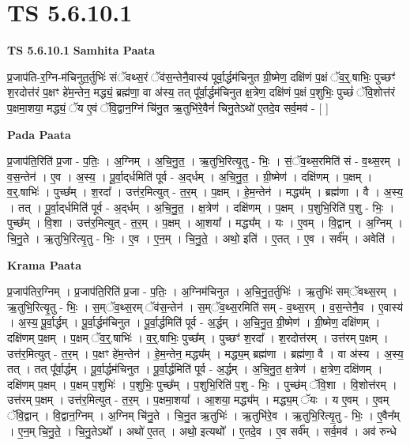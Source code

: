 \documentclass[17pt]{extarticle}
\begin{document}
\section{ TS 5.6.10.1 }

\textbf{TS 5.6.10.1 } \newline
\textbf{Samhita Paata} \newline

प्र॒जाप॑ति-र॒ग्नि-म॑चिनुत॒र्तुभिः॑ संॅवथ्स॒रं ॅव॑स॒न्तेनै॒वास्य॑ पूर्वा॒र्द्धम॑चिनुत ग्री॒ष्मेण॒ दक्षि॑णं प॒क्षं ॅव॒र्॒.षाभिः॒ पुच्छꣳ॑ श॒रदोत्त॑रं प॒क्षꣳ हे॑म॒न्तेन॒ मद्ध्यं॒ ब्रह्म॑णा॒ वा अ॑स्य॒ तत् पू᳚र्वा॒र्द्धम॑चिनुत क्ष॒त्रेण॒ दक्षि॑णं प॒क्षं प॒शुभिः॒ पुच्छं॑ ॅवि॒शोत्त॑रं प॒क्षमा॒शया॒ मद्ध्यं॒ ॅय ए॒वं ॅवि॒द्वान॒ग्निं चि॑नु॒त ऋ॒तुभि॑रे॒वैनं॑ चिनु॒तेऽथो॑ ए॒तदे॒व सर्व॒मव॑ - [  ] \newline

\textbf{Pada Paata} \newline

प्र॒जाप॑ति॒रिति॑ प्र॒जा - प॒तिः॒ । अ॒ग्निम् । अ॒चि॒नु॒त॒ । ऋ॒तुभि॒रित्यृ॒तु - भिः॒ । सं॒ॅव॒थ्स॒रमिति॑ सं - व॒थ्स॒रम् । व॒स॒न्तेन॑ । ए॒व । अ॒स्य॒ । पू॒र्वा॒द्‌र्धमिति॑ पूर्व - अ॒द्‌र्धम् । अ॒चि॒नु॒त॒ । ग्री॒ष्मेण॑ । दक्षि॑णम् । प॒क्षम् । व॒र्॒.षाभिः॑ । पुच्छ᳚म् । श॒रदा᳚ । उत्त॑र॒मित्युत् - त॒र॒म् । प॒क्षम् । हे॒म॒न्तेन॑ । मद्ध्य᳚म् । ब्रह्म॑णा । वै । अ॒स्य॒ । तत् । पू॒र्वा॒द्‌र्धमिति॑ पूर्व - अ॒द्‌र्धम् । अ॒चि॒नु॒त॒ । क्ष॒त्रेण॑ । दक्षि॑णम् । प॒क्षम् । प॒शुभि॒रिति॑ प॒शु - भिः॒ । पुच्छ᳚म् । वि॒शा । उत्त॑र॒मित्युत् - त॒र॒म् । प॒क्षम् । आ॒शया᳚ । मद्ध्य᳚म् । यः । ए॒वम् । वि॒द्वान् । अ॒ग्निम् । चि॒नु॒ते । ऋ॒तुभि॒रित्यृ॒तु - भिः॒ । ए॒व । ए॒न॒म् । चि॒नु॒ते॒ । अथो॒ इति॑ । ए॒तत् । ए॒व । सर्व᳚म् । अवेति॑ ।  \newline


\textbf{Krama Paata} \newline

प्र॒जाप॑तिर॒ग्निम् । प्र॒जाप॑ति॒रिति॑ प्र॒जा - प॒तिः॒ । अ॒ग्निम॑चिनुत । अ॒चि॒नु॒त॒र्तुभिः॑ । ऋ॒तुभिः॑ सम्ॅवथ्स॒रम् । ऋ॒तुभि॒रित्यृ॒तु - भिः॒ । स॒म्ॅव॒थ्स॒रम् ॅव॑स॒न्तेन॑ । स॒म्ॅव॒थ्स॒रमिति॑ सम् - व॒थ्स॒रम् । व॒स॒न्तेनै॒व । ए॒वास्य॑ । अ॒स्य॒ पू॒र्वा॒र्द्धम् । पू॒र्वा॒र्द्धम॑चिनुत । पू॒र्वा॒र्द्धमिति॑ पूर्व - अ॒र्द्धम् । अ॒चि॒नु॒त॒ ग्री॒ष्मेण॑ । ग्री॒ष्मेण॒ दक्षि॑णम् । दक्षि॑णम् प॒क्षम् । प॒क्षम् ॅव॒र्॒.षाभिः॑ । व॒र्॒.षाभिः॒ पुच्छ᳚म् । पुच्छꣳ॑ श॒रदा᳚ । श॒रदोत्त॑रम् । उत्त॑रम् प॒क्षम् । उत्त॑र॒मित्युत् - त॒र॒म् । प॒क्षꣳ हे॑म॒न्तेन॑ । हे॒म॒न्तेन॒ मद्ध्य᳚म् । मद्ध्य॒म् ब्रह्म॑णा । ब्रह्म॑णा॒ वै । वा अ॑स्य । अ॒स्य॒ तत् । तत् पू᳚र्वा॒र्द्धम् । पू॒र्वा॒र्द्धम॑चिनुत । पू॒र्वा॒र्द्धमिति॑ पूर्व - अ॒र्द्धम् । अ॒चि॒नु॒त॒ क्ष॒त्रेण॑ । क्ष॒त्रेण॒ दक्षि॑णम् । दक्षि॑णम् प॒क्षम् । प॒क्षम् प॒शुभिः॑ । प॒शुभिः॒ पुच्छ᳚म् । प॒शुभि॒रिति॑ प॒शु - भिः॒ । पुच्छ॑म् ॅवि॒शा । वि॒शोत्त॑रम् । उत्त॑रम् प॒क्षम् । उत्त॑र॒मित्युत् - त॒र॒म् । प॒क्षमा॒शया᳚ । आ॒शया॒ मद्ध्य᳚म् । मद्ध्य॒म् ॅयः । य ए॒वम् । ए॒वम् ॅवि॒द्वान् । वि॒द्वान॒ग्निम् । अ॒ग्निम् चि॑नु॒ते । चि॒नु॒त ऋ॒तुभिः॑ । ऋ॒तुभि॑रे॒व । ऋ॒तुभि॒रित्यृ॒तु - भिः॒ । ए॒वैन᳚म् । ए॒न॒म् चि॒नु॒ते॒ । चि॒नु॒तेऽथो᳚ । अथो॑ ए॒तत् । अथो॒ इत्यथो᳚ । ए॒तदे॒व । ए॒व सर्व᳚म् । सर्व॒मव॑ । अव॑ रुन्धे \newline
\end{document}
